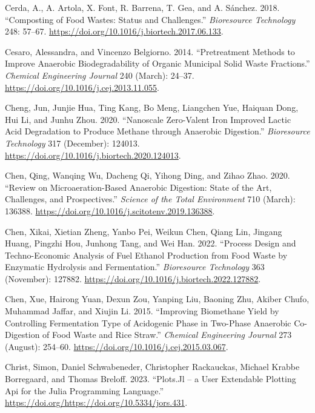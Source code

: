 \documentclass[11pt]{report}
\begin{document}
\begin{hangparas}{1.5em}{1}
\hypertarget{citeproc_bib_item_9}{Cerda, A., A. Artola, X. Font, R. Barrena, T. Gea, and A. Sánchez. 2018. “Composting of Food Wastes: Status and Challenges.” \textit{Bioresource Technology} 248: 57–67. \url{https://doi.org/10.1016/j.biortech.2017.06.133}.}

\hypertarget{citeproc_bib_item_10}{Cesaro, Alessandra, and Vincenzo Belgiorno. 2014. “Pretreatment Methods to Improve Anaerobic Biodegradability of Organic Municipal Solid Waste Fractions.” \textit{Chemical Engineering Journal} 240 (March): 24–37. \url{https://doi.org/10.1016/j.cej.2013.11.055}.}

\hypertarget{citeproc_bib_item_11}{Cheng, Jun, Junjie Hua, Ting Kang, Bo Meng, Liangchen Yue, Haiquan Dong, Hui Li, and Junhu Zhou. 2020. “Nanoscale Zero-Valent Iron Improved Lactic Acid Degradation to Produce Methane through Anaerobic Digestion.” \textit{Bioresource Technology} 317 (December): 124013. \url{https://doi.org/10.1016/j.biortech.2020.124013}.}

\hypertarget{citeproc_bib_item_12}{Chen, Qing, Wanqing Wu, Dacheng Qi, Yihong Ding, and Zihao Zhao. 2020. “Review on Microaeration-Based Anaerobic Digestion: State of the Art, Challenges, and Prospectives.” \textit{Science of the Total Environment} 710 (March): 136388. \url{https://doi.org/10.1016/j.scitotenv.2019.136388}.}

\hypertarget{citeproc_bib_item_13}{Chen, Xikai, Xietian Zheng, Yanbo Pei, Weikun Chen, Qiang Lin, Jingang Huang, Pingzhi Hou, Junhong Tang, and Wei Han. 2022. “Process Design and Techno-Economic Analysis of Fuel Ethanol Production from Food Waste by Enzymatic Hydrolysis and Fermentation.” \textit{Bioresource Technology} 363 (November): 127882. \url{https://doi.org/10.1016/j.biortech.2022.127882}.}

\hypertarget{citeproc_bib_item_14}{Chen, Xue, Hairong Yuan, Dexun Zou, Yanping Liu, Baoning Zhu, Akiber Chufo, Muhammad Jaffar, and Xiujin Li. 2015. “Improving Biomethane Yield by Controlling Fermentation Type of Acidogenic Phase in Two-Phase Anaerobic Co-Digestion of Food Waste and Rice Straw.” \textit{Chemical Engineering Journal} 273 (August): 254–60. \url{https://doi.org/10.1016/j.cej.2015.03.067}.}

\hypertarget{citeproc_bib_item_15}{Christ, Simon, Daniel Schwabeneder, Christopher Rackauckas, Michael Krabbe Borregaard, and Thomas Breloff. 2023. “Plots.Jl – a User Extendable Plotting Api for the Julia Programming Language.” \url{https://doi.org/https://doi.org/10.5334/jors.431}.}


\end{hangparas}
\end{document}
